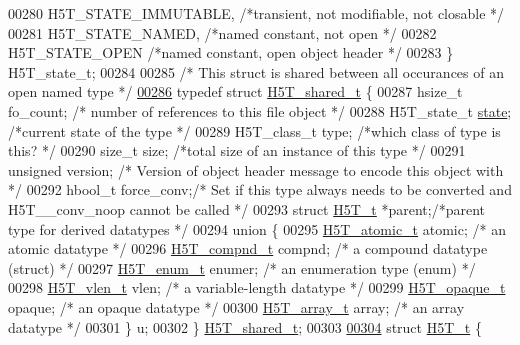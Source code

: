 \begin{DoxyCode}
00280     H5T\_STATE\_IMMUTABLE,        \textcolor{comment}{/*transient, not modifiable, not closable */}
00281     H5T\_STATE\_NAMED,            \textcolor{comment}{/*named constant, not open       */}
00282     H5T\_STATE\_OPEN          \textcolor{comment}{/*named constant, open object header */}
00283 \} H5T\_state\_t;
00284 
00285     \textcolor{comment}{/* This struct is shared between all occurances of an open named type */}
\hyperlink{struct_h5_t__shared__t}{00286} \textcolor{keyword}{typedef} \textcolor{keyword}{struct }\hyperlink{struct_h5_t__shared__t}{H5T\_shared\_t} \{
00287     hsize\_t     fo\_count; \textcolor{comment}{/* number of references to this file object */}
00288     H5T\_state\_t     \hyperlink{structstate}{state}; \textcolor{comment}{/*current state of the type          */}
00289     H5T\_class\_t     type;   \textcolor{comment}{/*which class of type is this?           */}
00290     \textcolor{keywordtype}{size\_t}      size;   \textcolor{comment}{/*total size of an instance of this type     */}
00291     \textcolor{keywordtype}{unsigned}            version;        \textcolor{comment}{/* Version of object header message to encode this object with */}
00292     hbool\_t     force\_conv;\textcolor{comment}{/* Set if this type always needs to be converted and H5T\_\_conv\_noop cannot be
       called */}
00293     \textcolor{keyword}{struct }\hyperlink{struct_h5_t__t}{H5T\_t}   *parent;\textcolor{comment}{/*parent type for derived datatypes      */}
00294     \textcolor{keyword}{union }\{
00295         \hyperlink{struct_h5_t__atomic__t}{H5T\_atomic\_t}    atomic; \textcolor{comment}{/* an atomic datatype              */}
00296         \hyperlink{struct_h5_t__compnd__t}{H5T\_compnd\_t}    compnd; \textcolor{comment}{/* a compound datatype (struct)    */}
00297         \hyperlink{struct_h5_t__enum__t}{H5T\_enum\_t}    enumer; \textcolor{comment}{/* an enumeration type (enum)       */}
00298         \hyperlink{struct_h5_t__vlen__t}{H5T\_vlen\_t}    vlen;   \textcolor{comment}{/* a variable-length datatype       */}
00299         \hyperlink{struct_h5_t__opaque__t}{H5T\_opaque\_t}    opaque; \textcolor{comment}{/* an opaque datatype              */}
00300         \hyperlink{struct_h5_t__array__t}{H5T\_array\_t}  array;  \textcolor{comment}{/* an array datatype                */}
00301     \} u;
00302 \} \hyperlink{struct_h5_t__shared__t}{H5T\_shared\_t};
00303 
\hyperlink{struct_h5_t__t}{00304} \textcolor{keyword}{struct }\hyperlink{struct_h5_t__t}{H5T\_t} \{

\end{DoxyCode}
